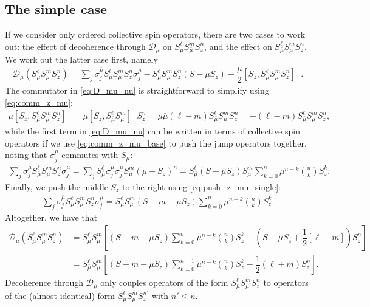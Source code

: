 \documentclass[aps,notitlepage,nofootinbib,11pt]{revtex4-1}
\newcommand{\f}[2]{\dfrac{#1}{#2}} %
\newcommand{\p}[1]{\left(#1\right)} %
\renewcommand{\sp}[1]{\left[#1\right]} %
\newcommand{\D}{\mathcal{D}}
\newcommand{\bmu}{{\bar\mu}}
\newcommand{\1}{\mathds{1}}
\begin{document}
\subsection{The simple case}

If we consider only ordered collective spin operators, there are two
cases to work out: the effect of decoherence through $\D_\mu$ on
$S_\mu^\ell S_\bmu^m S_z^n$, and the effect on
$S_\bmu^\ell S_\mu^m S_z^n$.  We work out the latter case first,
namely
\begin{align}
  \D_\mu\p{S_\bmu^\ell S_\mu^m S_z^n}
  = \sum_j \sigma_j^\bmu S_\bmu^\ell S_\mu^m S_z^n \sigma_j^\mu
  - S_\bmu^\ell S_\mu^m S_z^n \p{S - \mu S_z}
  + \f{\mu}{2} \sp{S_z, S_\bmu^\ell S_\mu^m S_z^n}_-.
  \label{eq:D_mu_nu}
\end{align}
The commutator in \eqref{eq:D_mu_nu} is straightforward to simplify
using \eqref{eq:comm_z_mu}:
\begin{align}
  \mu \sp{S_z, S_\bmu^\ell S_\mu^m S_z^n}_-
  = \mu \sp{S_z, S_\bmu^\ell S_\mu^m}_- S_z^n
  = \mu\bmu \p{\ell-m} S_\bmu^\ell S_\mu^m S_z^n
  = - \p{\ell-m} S_\bmu^\ell S_\mu^m S_z^n,
\end{align}
while the first term in \eqref{eq:D_mu_nu} can be written in terms of
collective spin operators if we use \eqref{eq:comm_z_mu_base} to push
the jump operators together, noting that $\sigma_j^\mu$ commutes with
$S_\mu$:
\begin{align}
  \sum_j \sigma_j^\bmu S_\bmu^\ell S_\mu^m S_z^n \sigma_j^\mu
  = \sum_j S_\bmu^\ell \sigma_j^\bmu \sigma_j^\mu S_\mu^m \p{\mu+S_z}^n
  = S_\bmu^\ell \p{S - \mu S_z} S_\mu^m
  \sum_{k=0}^n \mu^{n-k} { n \choose k } S_z^k.
  \label{eq:combine_jumps}
\end{align}
Finally, we push the middle $S_z$ to the right using
\eqref{eq:push_z_mu_single}:
\begin{align}
  \sum_j \sigma_j^\bmu S_\bmu^\ell S_\mu^m S_z^n \sigma_j^\mu
  = S_\bmu^\ell S_\mu^m \p{S - m - \mu S_z}
  \sum_{k=0}^n \mu^{n-k} { n \choose k } S_z^k.
\end{align}
Altogether, we have that
\begin{align}
  \D_\mu\p{S_\bmu^\ell S_\mu^m S_z^n}
  &= S_\bmu^\ell S_\mu^m \sp{\p{S - m - \mu S_z} \sum_{k=0}^n
    \mu^{n-k} { n \choose k } S_z^k
    - \p{S - \mu S_z + \f12\sp{\ell-m}} S_z^n} \\
  &= S_\bmu^\ell S_\mu^m \sp{\p{S - m - \mu S_z} \sum_{k=0}^{n-1}
    \mu^{n-k} { n \choose k } S_z^k - \f12 \p{\ell+m} S_z^n}.
\end{align}
Decoherence through $\D_\mu$ only couples operators of the form
$S_\bmu^\ell S_\mu^m S_z^n$ to operators of the (almost identical)
form $S_\bmu^\ell S_\mu^m S_z^{n'}$ with $n'\le n$.
\end{document}
